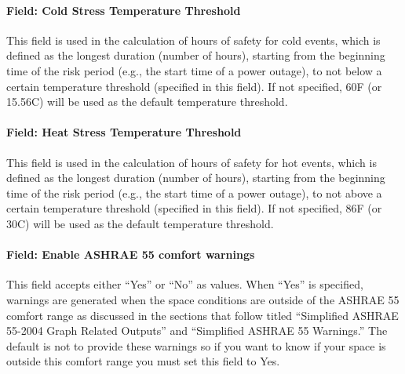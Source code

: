 \paragraph{Field: Cold Stress Temperature Threshold}\label{cold-stress-temperature-threshold}

This field is used in the calculation of hours of safety for cold events, which
is defined as the longest duration (number of hours), starting from the
beginning time of the risk period (e.g., the start time of a power outage), to
not below a certain temperature threshold (specified in this field). If not
specified, 60F (or 15.56C) will be used as the default temperature threshold.

\paragraph{Field: Heat Stress Temperature Threshold}\label{heat-stress-temperature-threshold}

This field is used in the calculation of hours of safety for hot events, which
is defined as the longest duration (number of hours), starting from the
beginning time of the risk period (e.g., the start time of a power outage), to
not above a certain temperature threshold (specified in this field). If not
specified, 86F (or 30C) will be used as the default temperature threshold.

\paragraph{Field: Enable ASHRAE 55 comfort warnings}\label{field-enable-ashrae-55-comfort-warnings}

This field accepts either ``Yes'' or ``No'' as values. When ``Yes'' is specified, warnings are generated when the space conditions are outside of the ASHRAE 55 comfort range as discussed in the sections that follow titled ``Simplified ASHRAE 55-2004 Graph Related Outputs'' and ``Simplified ASHRAE 55 Warnings.'' The default is not to provide these warnings so if you want to know if your space is outside this comfort range you must set this field to Yes.

